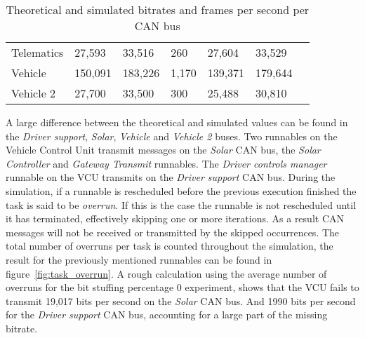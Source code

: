 \begin{table}[htb]
\begin{tabular}{@{}lllllll@{}}
        Telematics                                                   & 27,593                                                           & 33,516                                                           & 260                                                           & 27,604                                                          & 33,529                                                          &                                                               \\
        Vehicle                                                      & 150,091                                                          & 183,226                                                          & 1,170                                                         & 139,371                                                         & 179,644                                                         &                                                               \\
        Vehicle 2                                                    & 27,700                                                           & 33,500                                                           & 300                                                           & 25,488                                                          & 30,810                                                          &                                                               \\ \bottomrule
        \end{tabular}
        \caption{Theoretical and simulated bitrates and frames per second per CAN bus}
        \label{tab:bitrate_sim}
\end{table}

A large difference between the theoretical and simulated values can be found in the \textit{Driver support}, \textit{Solar}, \textit{Vehicle} and \textit{Vehicle 2} buses. Two runnables on the Vehicle Control Unit transmit messages on the \textit{Solar} CAN bus, the \textit{Solar Controller} and \textit{Gateway Transmit} runnables. The \textit{Driver controls manager} runnable on the VCU transmits on the \textit{Driver support} CAN bus. During the simulation, if a runnable is rescheduled before the previous execution finished the task is said to be \textit{overrun}. If this is the case the runnable is not rescheduled until it has terminated, effectively skipping one or more iterations. As a result CAN messages will not be received or transmitted by the skipped occurrences. The total number of overruns per task is counted throughout the simulation, the result for the previously mentioned runnables can be found in figure~\ref{fig:task_overrun}. A rough calculation using the average number of overruns for the bit stuffing percentage 0 experiment, shows that the VCU fails to transmit 19,017 bits per second on the \textit{Solar} CAN bus. And 1990 bits per second for the \textit{Driver support} CAN bus, accounting for a large part of the missing bitrate.

